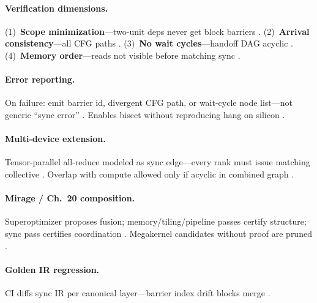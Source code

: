 \paragraph{Verification dimensions.}
(1)~\textbf{Scope minimization}---two-unit deps never get block barriers \citep{shah2024flashattention3,yirage2026,nvidia2022hopper}.
(2)~\textbf{Arrival consistency}---all CFG paths \citep{chen2020compilerbasedhardw,wu2024mirage}.
(3)~\textbf{No wait cycles}---handoff DAG acyclic \citep{mpk2025,semianalysis2024tma}.
(4)~\textbf{Memory order}---reads not visible before matching sync \citep{dao2022flashattention,dlbook,patel2025llminference}.

\paragraph{Error reporting.}
On failure: emit barrier id, divergent CFG path, or wait-cycle node list---not generic ``sync error'' \citep{yirage2026,chen2020compilerbasedhardw,taxbreak2026}.
Enables bisect without reproducing hang on silicon \citep{shah2024flashattention3,patel2025llminference}.

\paragraph{Multi-device extension.}
Tensor-parallel all-reduce modeled as sync edge---every rank must issue matching collective \citep{patel2025llminference,dlbook,mpk2025}.
Overlap with compute allowed only if acyclic in combined graph \citep{shah2024flashattention3,yirage2026}.

\paragraph{Mirage / Ch.~20 composition.}
Superoptimizer proposes fusion; memory/tiling/pipeline passes certify structure; sync pass certifies coordination \citep{wu2024mirage,mpk2025,yirage2026}.
Megakernel candidates without proof are pruned \citep{chen2020compilerbasedhardw,taxbreak2026}.

\paragraph{Golden IR regression.}
CI diffs sync IR per canonical layer---barrier index drift blocks merge \citep{yirage2026,wu2024mirage,shah2024flashattention3}.

